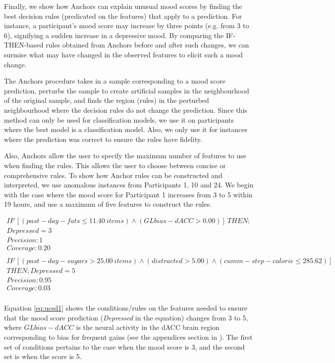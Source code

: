 Finally, we show how Anchors can explain unusual mood scores by finding the best decision rules (predicated on the features) that apply to a prediction. For instance, a participant's mood score may increase by three points (e.g. from 3 to 6), signifying a sudden increase in a depressive mood. By comparing the IF-THEN-based rules obtained from Anchors before and after such changes, we can surmise what may have changed in the observed features to elicit such a mood change. 

The Anchors procedure takes in a sample corresponding to a mood score prediction, perturbs the sample to create artificial samples in the neighbourhood of the original sample, and finds the region (rules) in the perturbed neighbourhood where the decision rules do not change the prediction. Since this method can only be used for classification models, we use it on participants where the best model is a classification model. Also, we only use it for instances where the prediction was correct to ensure the rules have fidelity.

Also, Anchors allow the user to specify the maximum number of features to use when finding the rules. This allows the user to choose between concise or comprehensive rules. To show how Anchor rules can be constructed and interpreted, we use anomalous instances from Participants 1, 10 and 24. We begin with the case where the mood score for Participant 1 increases from 3 to 5 within 19 hours, and use a maximum of five features to construct the rules.


\begin{multline}
IF \ [(past-day-fats \leq 11.40 \ items) \land (GLbias-dACC > 0.00)] \ THEN; \\
Depressed = 3 \\
Precision: 1\\
Coverage: 0.20 \\
\\
IF \ [(past-day-sugars > 25.00 \ items) \land (distracted > 5.00) \land (cumm-step-calorie \leq 285.62)] \\ THEN;
Depressed = 5 \\
Precision: 0.95\\
Coverage: 0.03 \\
 \label{eq:ucsd1}
\end{multline}

Equation \ref{eq:ucsd1} shows the conditions/rules on the features needed to ensure that the mood score prediction (\emph{Depressed} in the equation) changes from 3 to 5, where $GLbias-dACC$ is the neural activity in the dACC brain region corresponding to bias for frequent gains (see the appendices section in \cite{shah_personalized_2021}). The first set of conditions pertains to the case when the mood score is 3, and the second set is when the score is 5. 

